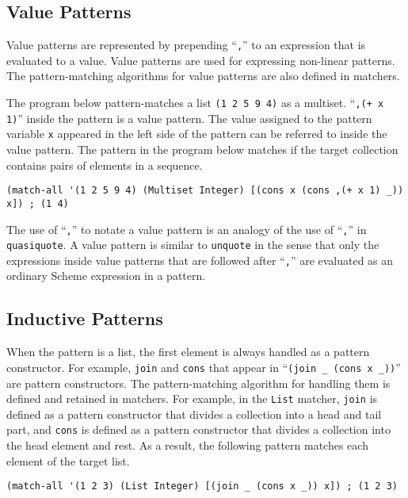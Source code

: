 \documentclass[acmlarge]{acmart}
\newcommand{\new}[1]{\textcolor{blue}{#1}}
\begin{document}
\subsection{Value Patterns}

Value patterns are represented by prepending ``\lstinline{,}'' to an expression that is evaluated to a value.
Value patterns are used for expressing non-linear patterns.
The pattern-matching algorithms for value patterns are also defined in matchers.

The program below pattern-matches a list \lstinline{(1 2 5 9 4)} as a multiset.
``\lstinline{,(+ x 1)}'' inside the pattern is a value pattern.
The value assigned to the pattern variable \lstinline{x} appeared in the left side of the pattern can be referred to inside the value pattern.
The pattern in the program below matches if the target collection contains pairs of elements in a sequence.

\begin{lstlisting}[language=egison]
(match-all '(1 2 5 9 4) (Multiset Integer) [(cons x (cons ,(+ x 1) _)) x]) ; (1 4)
\end{lstlisting}

The use of ``\lstinline{,}'' to notate a value pattern is an analogy of the use of ``\lstinline{,}'' in \lstinline{quasiquote}.
A value pattern is similar to \lstinline{unquote} in the sense that only the expressions inside value patterns that are followed after ``\lstinline{,}'' are evaluated as an ordinary Scheme expression in a pattern.

\subsection{Inductive Patterns}

When the pattern is a list, the first element is always handled as a pattern constructor.
For example, \lstinline{join} and \lstinline{cons} that appear in ``\lstinline{(join _ (cons x _))}'' are pattern constructors.
The pattern-matching algorithm for handling them is defined and retained in matchers.
For example, in the \lstinline{List} matcher, \lstinline{join} is defined as a pattern constructor that divides a collection into a head and tail part, and \lstinline{cons} is defined as a pattern constructor that divides a collection into the head element and rest.
As a result, the following pattern matches each element of the target list.

\begin{lstlisting}[language=egison]
(match-all '(1 2 3) (List Integer) [(join _ (cons x _)) x]) ; (1 2 3)
\end{lstlisting}
\end{document}
